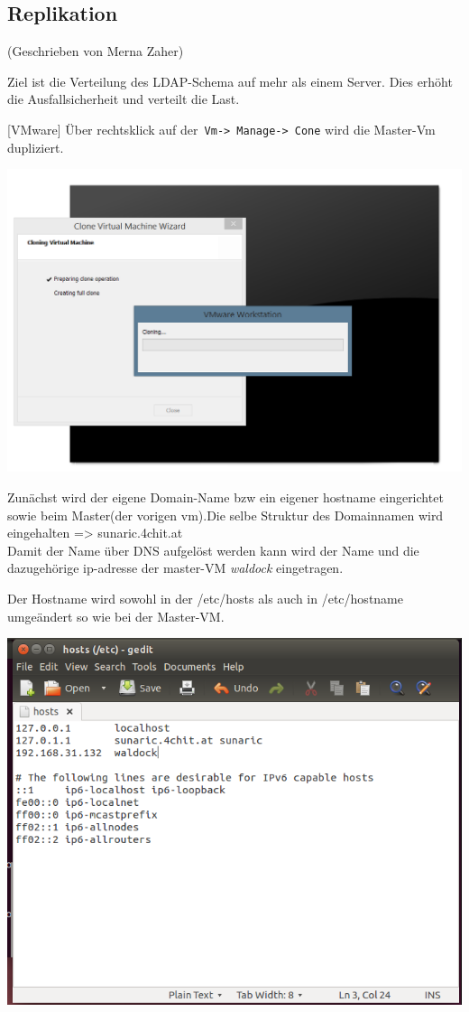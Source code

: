 
\subsection{Replikation}
(Geschrieben von Merna Zaher)

Ziel ist die Verteilung des LDAP-Schema auf mehr als einem Server. Dies erhöht die Ausfallsicherheit und verteilt die Last.
 

[VMware] Über rechtsklick auf der\verb| Vm-> Manage-> Cone| wird die Master-Vm dupliziert.


\begin{center}
	\includegraphics[width=0.75\linewidth]{images/a4_clonevirtualmachine.PNG}
\end{center}

Zunächst wird der eigene Domain-Name bzw ein eigener hostname eingerichtet sowie beim Master(der vorigen vm).Die selbe Struktur des Domainnamen wird eingehalten => sunaric.4chit.at\\
Damit der Name über DNS aufgelöst werden kann wird der Name und die dazugehörige ip-adresse der master-VM \textit{waldock} eingetragen.

Der Hostname wird sowohl in der /etc/hosts als auch in /etc/hostname umgeändert so wie bei der  Master-VM.
\begin{center}
	\includegraphics[width=1.0\linewidth]{images/a5_addmasterdns.PNG}
\end{center}


